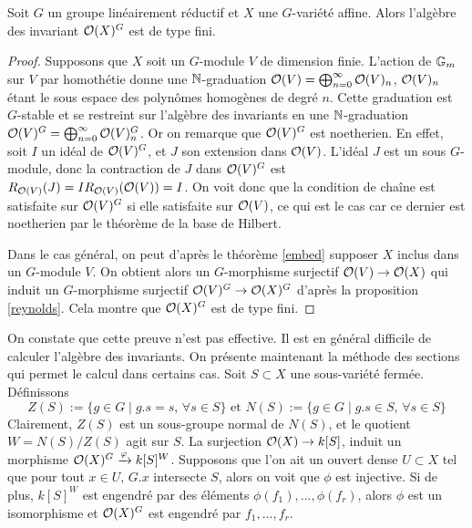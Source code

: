 \begin{thm}[Hilbert]\label{hilbert}
Soit $G$ un groupe linéairement réductif et $X$ une $G$-variété affine. Alors l'algèbre des invariant $\mathcal{O}(X)^G$ est de type fini.
\end{thm}
\begin{proof}
Supposons que $X$ soit un $G$-module $V$ de dimension finie. L'action de $\mathbb{G}_m$ sur $V$ par homothétie donne une $\mathbb{N}$-graduation $\mathcal{O}(V)=\bigoplus_{n=0}^{\infty}\mathcal{O}(V)_n$, $\mathcal{O}(V)_n$ étant le sous espace des polynômes homogènes de degré $n$. Cette graduation est $G$-stable et se restreint sur l'algèbre des invariants en une $\mathbb{N}$-graduation $\mathcal{O}(V)^G=\bigoplus_{n=0}^{\infty}\mathcal{O}(V)^G_n$. Or on remarque que $\mathcal{O}(V)^G$ est noetherien. En effet, soit $I$ un idéal de $\mathcal{O}(V)^G$, et $J$ son extension dans $\mathcal{O}(V)$. L'idéal $J$ est un sous $G$-module, donc la contraction de $J$ dans $\mathcal{O}(V)^G$ est $R_{\mathcal{O}(V)}(J)=IR_{\mathcal{O}(V)}(\mathcal{O}(V))=I$. On voit donc que la condition de chaîne est satisfaite sur $\mathcal{O}(V)^G$ si elle satisfaite sur $\mathcal{O}(V)$, ce qui est le cas car ce dernier est noetherien par le théorème de la base de Hilbert. 

Dans le cas général, on peut d'après le théorème \ref{embed} supposer $X$ inclus dans un $G$-module $V$. On obtient alors un $G$-morphisme surjectif $\mathcal{O}(V) \rightarrow \mathcal{O}(X)$ qui induit un $G$-morphisme surjectif $\mathcal{O}(V)^G \rightarrow \mathcal{O}(X)^G$ d'après la proposition \ref{reynolds}. Cela montre que $\mathcal{O}(X)^G$ est de type fini.
\end{proof}

On constate que cette preuve n'est pas effective. Il est en général difficile de calculer l'algèbre des invariants. On présente maintenant la méthode des sections qui permet le calcul dans certains cas. Soit $S\subset X$ une sous-variété fermée. Définissons 
$$Z(S):=\lbrace g\in G\mid g.s=s,\,\forall s \in S\rbrace\text{ et }N(S):=\lbrace g\in G\mid g.s\in S,\,\forall s \in S\rbrace$$
Clairement, $Z(S)$ est un sous-groupe normal de $N(S)$, et le quotient $W=N(S)/Z(S)$ agit sur $S$. La surjection $\mathcal{O}(X)\rightarrow k[S]$, induit un morphisme $\mathcal{O}(X)^G\xrightarrow{\varphi} k[S]^W$. Supposons que l'on ait un ouvert dense $U\subset X$ tel que pour tout $x\in U,\, G.x$ intersecte $S$, alors on voit que $\phi$ est injective. Si de plus, $k[S]^W$ est engendré par des éléments $\phi(f_1),...,\phi(f_r)$, alors $\phi$ est un isomorphisme et $\mathcal{O}(X)^G$ est engendré par $f_1,...,f_r$.

